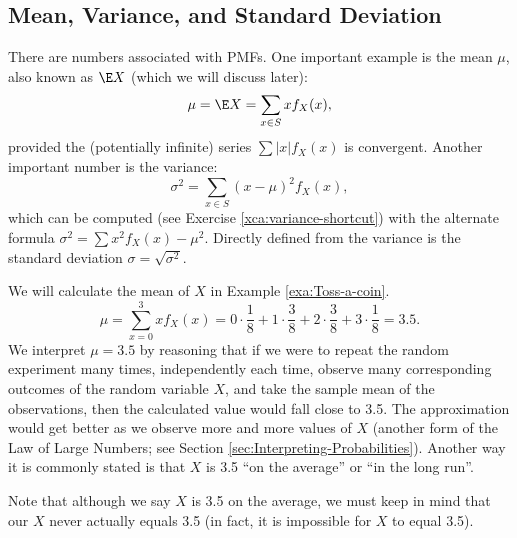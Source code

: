 \documentclass[captions=tableheading]{scrbook}
\begin{document}
\subsection{Mean, Variance, and Standard Deviation}
\label{sec-5-1-2}

\label{sub:mean-variance-sd}

There are numbers associated with PMFs. One important example is the mean \(\mu\), also known as \(\E X\) (which we will discuss later):
\begin{equation}
\mu=\E X=\sum_{x\in S}xf_{X}(x),
\end{equation}
provided the (potentially infinite) series \(\sum|x|f_{X}(x)\) is convergent. Another important number is the variance:
\begin{equation}
\sigma^{2}=\sum_{x\in S}(x-\mu)^{2}f_{X}(x),
\end{equation}
which can be computed (see Exercise \ref{xca:variance-shortcut}) with the alternate formula \(\sigma^{2}=\sum x{}^{2}f_{X}(x)-\mu^{2}\). Directly defined from the variance is the standard deviation \(\sigma=\sqrt{\sigma^{2}}\).
 
\begin{example}
\label{exa:disc-pmf-mean}
We will calculate the mean of \(X\) in Example \ref{exa:Toss-a-coin}.
\[
\mu=\sum_{x=0}^{3}xf_{X}(x)=0\cdot\frac{1}{8}+1\cdot\frac{3}{8}+2\cdot\frac{3}{8}+3\cdot\frac{1}{8}=3.5.
\]
We interpret \(\mu = 3.5\) by reasoning that if we were to repeat the random experiment many times, independently each time, observe many corresponding outcomes of the random variable \(X\), and take the sample mean of the observations, then the calculated value would fall close to 3.5. The approximation would get better as we observe more and more values of \(X\) (another form of the Law of Large Numbers; see Section \ref{sec:Interpreting-Probabilities}). Another way it is commonly stated is that \(X\) is 3.5 ``on the average'' or ``in the long run''.
\end{example}

\begin{rem}
Note that although we say \(X\) is 3.5 on the average, we must keep in mind that our \(X\) never actually equals 3.5 (in fact, it is impossible for \(X\) to equal 3.5).
\end{rem}
\end{document}
